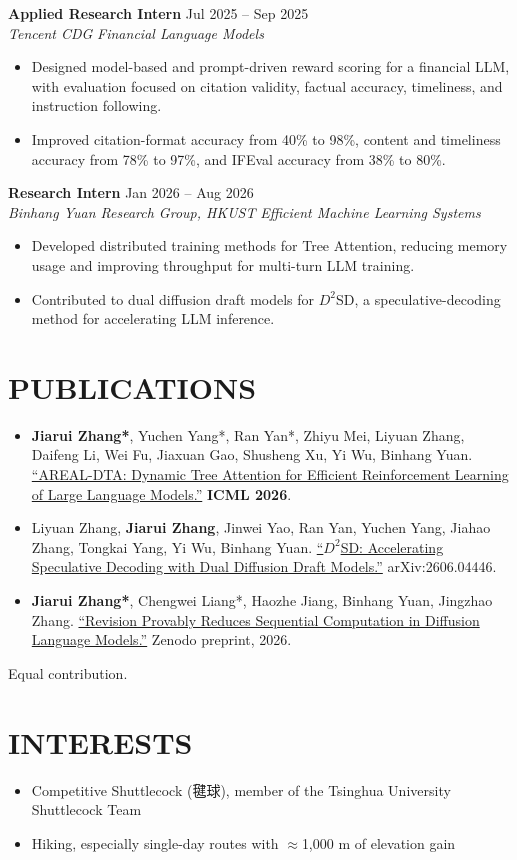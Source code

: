 \documentclass[11pt,a4paper]{article}
\newcommand{\entry}[4]{%
  \textbf{#1} \hfill {\small #2}\\[-1pt]
  \textit{#3} \hfill {\small\textit{#4}}%
}
\begin{document}
\entry{Applied Research Intern}{Jul 2025 -- Sep 2025}{Tencent CDG}{Financial Language Models}
\begin{itemize}
  \item Designed model-based and prompt-driven reward scoring for a financial LLM, with evaluation focused on citation validity, factual accuracy, timeliness, and instruction following.
  \item Improved citation-format accuracy from 40\% to 98\%, content and timeliness accuracy from 78\% to 97\%, and IFEval accuracy from 38\% to 80\%.
\end{itemize}

\entry{Research Intern}{Jan 2026 -- Aug 2026}{Binhang Yuan Research Group, HKUST}{Efficient Machine Learning Systems}
\begin{itemize}
  \item Developed distributed training methods for Tree Attention, reducing memory usage and improving throughput for multi-turn LLM training.
  \item Contributed to dual diffusion draft models for $D^2$SD, a speculative-decoding method for accelerating LLM inference.
\end{itemize}

\section*{PUBLICATIONS}
\begin{itemize}
  \item \textbf{Jiarui Zhang*}, Yuchen Yang*, Ran Yan*, Zhiyu Mei, Liyuan Zhang, Daifeng Li, Wei Fu, Jiaxuan Gao, Shusheng Xu, Yi Wu, Binhang Yuan. \href{https://arxiv.org/abs/2602.00482}{``AREAL-DTA: Dynamic Tree Attention for Efficient Reinforcement Learning of Large Language Models.''} \textbf{ICML 2026}.
  \item Liyuan Zhang, \textbf{Jiarui Zhang}, Jinwei Yao, Ran Yan, Yuchen Yang, Jiahao Zhang, Tongkai Yang, Yi Wu, Binhang Yuan. \href{https://arxiv.org/abs/2606.04446}{``$D^2$SD: Accelerating Speculative Decoding with Dual Diffusion Draft Models.''} arXiv:2606.04446.
  \item \textbf{Jiarui Zhang*}, Chengwei Liang*, Haozhe Jiang, Binhang Yuan, Jingzhao Zhang. \href{https://zenodo.org/records/23105365}{``Revision Provably Reduces Sequential Computation in Diffusion Language Models.''} Zenodo preprint, 2026.
\end{itemize}
{\footnotesize * Equal contribution.}

\section*{INTERESTS}
\begin{itemize}
  \item Competitive Shuttlecock (毽球), member of the Tsinghua University Shuttlecock Team
  \item Hiking, especially single-day routes with $\approx$1,000 m of elevation gain
\end{itemize}
\end{document}
